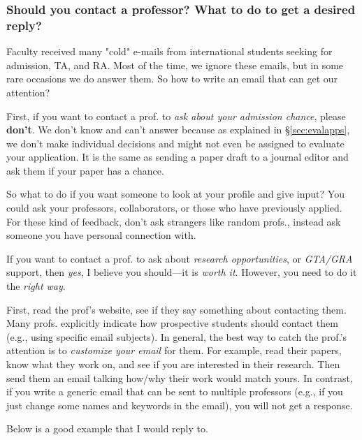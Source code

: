 \documentclass[11pt]{article}
\begin{document}
\subsubsection{Should you contact a professor? What to do to get a desired reply?}\label{sec:contact}

Faculty received many "cold" e-mails from international students seeking for admission, TA, and RA. Most of the time, we ignore these emails, but in some rare occasions we do answer them. So how to write an email that can get our attention?



First, if you want to contact a prof. to \emph{ask about your admission chance}, please \textbf{don't}. We don't know and can't answer because as explained in \S\ref{sec:evalapps}, we don't make individual decisions and might not even be assigned to evaluate your application.  It is the same as sending a paper draft to a journal editor and ask them if your paper has a chance.  

So what to do if you want someone to look at your profile and give input? You could ask your professors, collaborators, or those who have previously applied. For these kind of feedback,  don't ask strangers like random profs., instead ask someone you have personal connection with.  

If you want to contact a prof. to ask about \emph{research opportunities}, or \emph{GTA/GRA} support, then \emph{yes}, I believe you should---it is \emph{worth it}. However, you need to do it the \emph{right way}.



First, read the prof's website, see if they say something about contacting them. Many profs. explicitly indicate how prospective students should contact them (e.g., using specific email subjects). 
In general, the best way to catch the prof.'s attention is to \emph{customize your email} for them.  For example, read their papers, know what they work on, and see if you are interested in their research. Then send them an email talking how/why their work would match yours.
In contrast, if you write a generic email that can be sent to multiple professors (e.g., if you just change some names and keywords in the email), you will not get a response. 

Below is a good example that I would reply to.   
\end{document}
